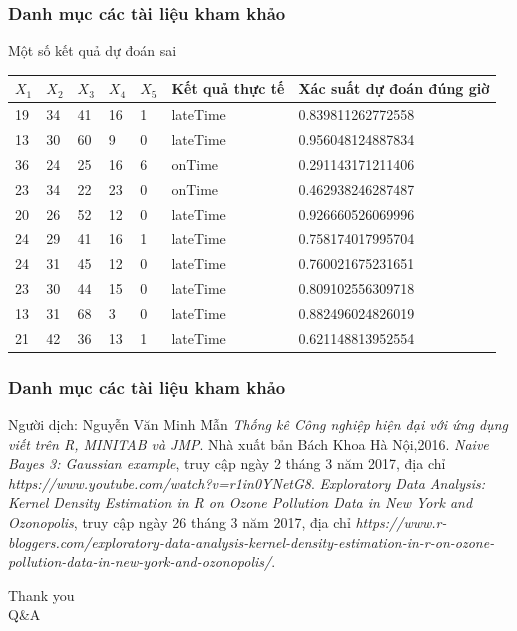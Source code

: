 \documentclass[t]{beamer}
\begin{document}
\begin{frame}
\frametitle{Danh mục các tài liệu kham khảo}

Một số kết quả dự đoán sai

\begin{flushleft}
\begin{tabular}{|p{0.6cm}|p{0.6cm}|p{0.6cm}|p{0.6cm}|p{0.6cm}|p{1.6cm}|p{5cm}|}
\hline
$X_1$& $X_2$ & $X_3$ & $X_4$ & $X_5$ & Kết quả thực tế & Xác suất dự đoán đúng giờ \\ 
\hline
19 & 34 & 41 & 16 & 1 & lateTime & 0.839811262772558\\
\hline
13 & 30 & 60 & 9 & 0 & lateTime & 0.956048124887834\\
\hline
36 & 24 & 25 & 16 & 6 & onTime & 0.291143171211406\\
\hline
23 & 34 & 22 & 23 & 0 & onTime & 0.462938246287487\\
\hline
20 & 26 & 52 & 12 & 0 & lateTime & 0.926660526069996\\
\hline
24 & 29 & 41 & 16 & 1 & lateTime & 0.758174017995704\\
\hline
24 & 31 & 45 & 12 & 0 & lateTime & 0.760021675231651\\
\hline
23 & 30 & 44 & 15 & 0 & lateTime & 0.809102556309718\\
\hline
13 & 31 & 68 & 3 & 0 & lateTime & 0.882496024826019\\
\hline
21 & 42 & 36 & 13 & 1 & lateTime & 0.621148813952554\\
\hline
\end{tabular}
\end{flushleft}
\end{frame}


\begin{frame}
\frametitle{Danh mục các tài liệu kham khảo}
\begin{thebibliography}{}
 Người dịch: Nguyễn Văn Minh Mẫn \emph{Thống kê Công nghiệp hiện đại với ứng dụng viết trên R, MINITAB và JMP}. Nhà xuất bản Bách Khoa Hà Nội,2016.
	\emph{Naive Bayes 3: Gaussian example}, truy cập ngày 2 tháng 3 năm 2017,
	địa chỉ \emph{https://www.youtube.com/watch?v=r1in0YNetG8}.	
	\emph{Exploratory Data Analysis: Kernel Density Estimation in R on Ozone Pollution Data in New York and Ozonopolis}, truy cập ngày 26 tháng 3 năm 2017,
	địa chỉ \emph{https://www.r-bloggers.com/exploratory-data-analysis-kernel-density-estimation-in-r-on-ozone-pollution-data-in-new-york-and-ozonopolis/}.
\end{thebibliography}
\end{frame}

\begin{frame}[c]{ }
\begin{Huge}
\centering
Thank you\\Q\&A\\
\end{Huge}
\end{frame}
\end{document}
